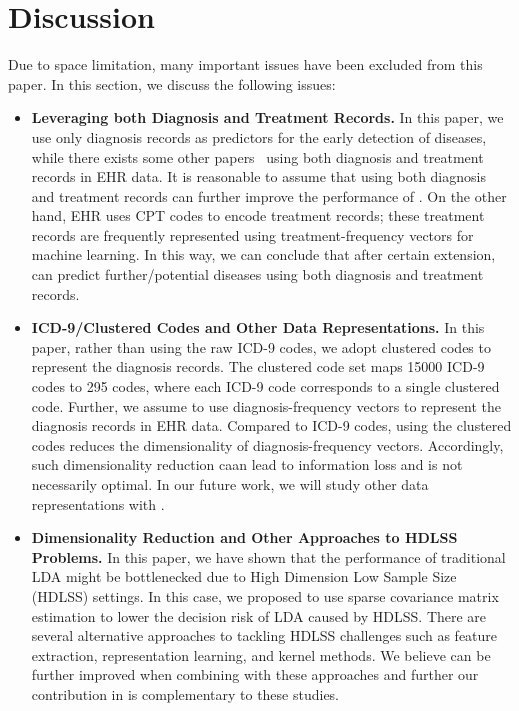 \section{Discussion}
\label{sec:6}

Due to space limitation, many important issues  have been excluded from this paper. 
In this section, we discuss the following issues:
\begin{itemize}
\item \textbf{Leveraging both Diagnosis and Treatment Records. } In this paper, we use only diagnosis records as predictors for the early detection of diseases, while there exists some other papers~\cite{wang_towards_2012,liu_temporal_2015,gotz_methodology_2014} using both diagnosis and treatment records in EHR data. 
It is reasonable to assume that using both diagnosis and treatment records can further improve the performance of \TheName{}. 
On the other hand, EHR uses CPT codes to encode treatment records; these treatment records are frequently represented using treatment-frequency vectors for machine learning. 
In this way, we can conclude that after certain extension, \TheName{} can predict further/potential diseases using both diagnosis and treatment records.

\item \textbf{ICD-9/Clustered Codes and Other Data Representations. } In this paper, rather than using the raw ICD-9 codes, we adopt clustered codes to represent the diagnosis records.  
The clustered code set maps 15000 ICD-9 codes to 295 codes, where each ICD-9 code corresponds to a single clustered code. 
Further, we assume to use diagnosis-frequency vectors to represent the diagnosis records in EHR data. 
Compared to ICD-9 codes, using the clustered codes reduces the dimensionality of diagnosis-frequency vectors. 
Accordingly, such dimensionality reduction caan lead to information loss and is not necessarily optimal. 
In our future work, we will study other data representations with \TheName{}.

\item \textbf{Dimensionality Reduction and Other Approaches to HDLSS Problems. } In this paper, we have shown that the performance of traditional LDA might be bottlenecked due to High Dimension Low Sample Size (HDLSS) settings. 
In this case, we proposed to use sparse covariance matrix estimation to lower the decision risk of LDA caused by HDLSS. 
There are several alternative approaches to tackling HDLSS challenges such as feature extraction, representation learning, and kernel methods. 
We believe \TheName{} can be further improved when combining with these approaches and further our contribution in \TheName{} is complementary to these studies.


\end{itemize}
